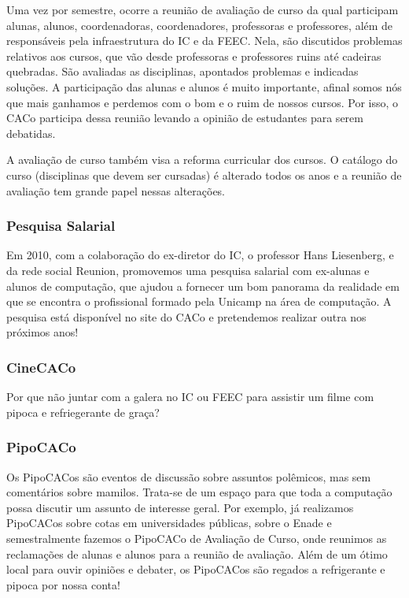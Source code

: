 Uma vez por semestre, ocorre a reunião de avaliação de curso da qual participam
alunas, alunos, coordenadoras, coordenadores, professoras e professores, além
de responsáveis pela infraestrutura do IC e da FEEC. Nela, são discutidos
problemas relativos aos cursos, que vão desde professoras e professores ruins
até cadeiras quebradas. São avaliadas as disciplinas, apontados problemas e
indicadas soluções. A participação das alunas e alunos é muito importante,
afinal somos nós que mais ganhamos e perdemos com o bom e o ruim de nossos
cursos. Por isso, o CACo participa dessa reunião levando a opinião de
estudantes para serem debatidas.

A avaliação de curso também visa a reforma curricular dos cursos. O catálogo do
curso (disciplinas que devem ser cursadas) é alterado todos os anos e a reunião
de avaliação tem grande papel nessas alterações.

\subsubsection{Pesquisa Salarial}

Em 2010, com a colaboração do ex-diretor do IC, o professor Hans Liesenberg, e
da rede social Reunion, promovemos uma pesquisa salarial com ex-alunas e alunos
de computação, que ajudou a fornecer um bom panorama da realidade em que se
encontra o profissional formado pela Unicamp na área de computação. A pesquisa
está disponível no site do CACo e pretendemos realizar outra nos próximos anos!

\subsubsection{CineCACo}

Por que não juntar com a galera no IC ou FEEC para assistir um filme com pipoca
e refriegerante de graça?

\subsubsection{PipoCACo}

Os PipoCACos são eventos de discussão sobre assuntos polêmicos, mas sem
comentários sobre mamilos. Trata-se de um espaço para que toda a computação
possa discutir um assunto de interesse geral. Por exemplo, já realizamos
PipoCACos sobre cotas em universidades públicas, sobre o Enade e semestralmente
fazemos o PipoCACo de Avaliação de Curso, onde reunimos as reclamações de
alunas e alunos para a reunião de avaliação. Além de um ótimo local para ouvir
opiniões e debater, os PipoCACos são regados a refrigerante e pipoca por nossa
conta!


